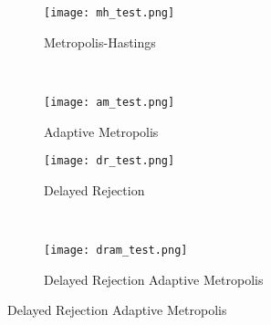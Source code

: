 \documentclass{article}
\begin{document}
\begin{figure}
    \centering
    \begin{subfigure}{0.48\textwidth}
        \centering
        \texttt{[image: mh\_test.png]}
        \caption{Metropolis-Hastings}
    \end{subfigure}
    ~
    \begin{subfigure}{0.48\textwidth}
        \centering
        \texttt{[image: am\_test.png]}
        \caption{Adaptive Metropolis}
    \end{subfigure}

    \begin{subfigure}{0.48\textwidth}
        \centering
        \texttt{[image: dr\_test.png]}
        \caption{Delayed Rejection}
    \end{subfigure}
    ~
    \begin{subfigure}{0.48\textwidth}
        \centering
        \texttt{[image: dram\_test.png]}
        \caption{Delayed Rejection Adaptive Metropolis}
    \end{subfigure}
\end{figure}
\end{document}
